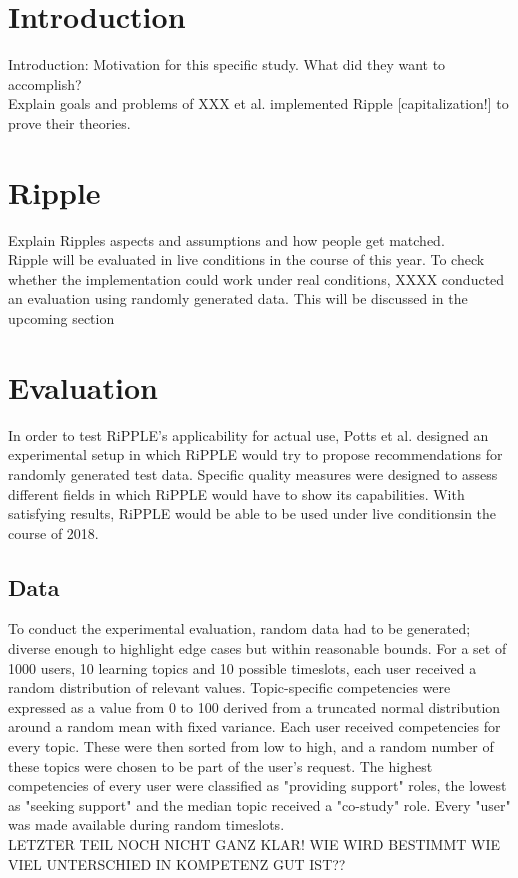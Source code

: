 \documentclass[nochapterpage,bigchapter,linedtoc,longdoc,colorback,accentcolor=tud3b]{tudreport}
\begin{document}
\section{Introduction}
Introduction: Motivation for this specific study. What did they want to accomplish?\\
Explain goals and problems of 
XXX et al. implemented Ripple [capitalization!] to prove their theories. 
\section{Ripple}
Explain Ripples aspects and assumptions and how people get matched.\\
Ripple will be evaluated in live conditions in the course of this year. To check whether the implementation could work under real conditions, XXXX conducted an evaluation using randomly generated data. This will be discussed in the upcoming section\\

\section{Evaluation}
In order to test RiPPLE's applicability for actual use, Potts et al. designed an experimental setup in which RiPPLE would try to propose recommendations for randomly generated test data. Specific quality measures were designed to assess different fields in which RiPPLE would have to show its capabilities. With satisfying results, RiPPLE would be able to be used under live conditionsin the course of 2018.\\

\subsection{Data}
To conduct the experimental evaluation, random data had to be generated; diverse enough to highlight edge cases but within reasonable bounds. For a set of 1000 users, 10 learning topics and 10 possible timeslots, each user received a random distribution of relevant values. Topic-specific competencies were expressed as a value from 0 to 100 derived from a truncated normal distribution around a random mean with fixed variance. Each user received competencies for every topic. These were then sorted from low to high, and a random number of these topics were chosen to be part of the user's request. The highest competencies of every user were classified as "providing support" roles, the lowest as "seeking support" and the median topic received a "co-study" role. Every "user" was made available during random timeslots.\\
LETZTER TEIL NOCH NICHT GANZ KLAR! WIE WIRD BESTIMMT WIE VIEL UNTERSCHIED IN KOMPETENZ GUT IST??\\
\end{document}
